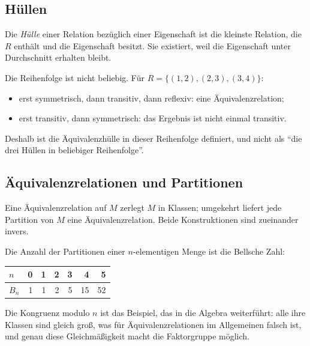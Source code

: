 \documentclass[12pt, a4paper]{article}
\begin{document}
\subsection{Hüllen}

\begin{definitionbox}
Die \emph{Hülle} einer Relation bezüglich einer Eigenschaft ist die kleinste
Relation, die $R$ enthält und die Eigenschaft besitzt. Sie existiert, weil
die Eigenschaft unter Durchschnitt erhalten bleibt.
\end{definitionbox}

Die Reihenfolge ist nicht beliebig. Für $R = \{(1,2),(2,3),(3,4)\}$:
\begin{itemize}
  \item erst symmetrisch, dann transitiv, dann reflexiv: eine
        Äquivalenzrelation;
  \item erst transitiv, dann symmetrisch: das Ergebnis ist nicht einmal
        transitiv.
\end{itemize}

Deshalb ist die Äquivalenzhülle in dieser Reihenfolge definiert, und nicht
als "`die drei Hüllen in beliebiger Reihenfolge"'.

\subsection{Äquivalenzrelationen und Partitionen}

\begin{definitionbox}
Eine Äquivalenzrelation auf $M$ zerlegt $M$ in Klassen; umgekehrt liefert
jede Partition von $M$ eine Äquivalenzrelation. Beide Konstruktionen sind
zueinander invers.
\end{definitionbox}

Die Anzahl der Partitionen einer $n$-elementigen Menge ist die Bellsche Zahl:

\begin{center}
\begin{tabular}{lrrrrrr}
\toprule
$n$ & 0 & 1 & 2 & 3 & 4 & 5\\
\midrule
$B_n$ & 1 & 1 & 2 & 5 & 15 & 52\\
\bottomrule
\end{tabular}
\end{center}

Die Kongruenz modulo $n$ ist das Beispiel, das in die Algebra weiterführt:
alle ihre Klassen sind gleich groß, was für Äquivalenzrelationen im
Allgemeinen falsch ist, und genau diese Gleichmäßigkeit macht die
Faktorgruppe möglich.
\end{document}

